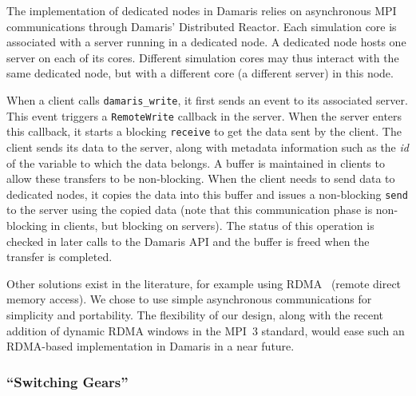 
The implementation of dedicated nodes in Damaris relies on asynchronous MPI communications
through Damaris' Distributed Reactor.
Each simulation core is associated with a server
running in a dedicated node. A dedicated node hosts one server on each of its cores. 
Different simulation cores may thus interact with the same dedicated node, 
but with a different core (a different server) in this node.

When a client calls \texttt{damaris\_write}, it first
sends an event to its associated server. This event triggers a \texttt{RemoteWrite} callback
in the server. When the server enters this callback, it starts a blocking \texttt{receive} to
get the data sent by the client. The client sends its data
to the server, along with metadata information such as the \emph{id} of the variable to which the data belongs.
A buffer is maintained in clients to allow these transfers to be non-blocking. When the client
needs to send data to dedicated nodes, it copies the data into this buffer and issues a non-blocking \texttt{send}
to the server using the copied data (note that this communication phase is non-blocking in clients, but blocking
on servers). The status of this operation is checked in later calls to the 
Damaris API and the buffer is freed when the transfer is completed.

Other solutions exist in the literature, for example using RDMA~\cite{docan2010enabling}
(remote direct memory access). We chose to use simple asynchronous communications for simplicity
and portability. The flexibility of our design, along with the recent addition of 
dynamic RDMA windows in the MPI~3 standard, would ease such an RDMA-based implementation 
in Damaris in a near future.

\subsubsection{``Switching Gears''}

